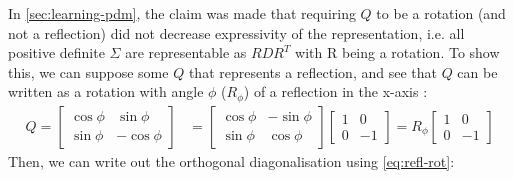 \documentclass[a4paper, 12pt]{report}
\begin{document}
In \ref{sec:learning-pdm}, the claim was made that requiring $Q$ to be a rotation (and not a reflection) did not decrease expressivity of the representation, i.e. all positive definite $\Sigma$ are representable as $RDR^T$ with R being a rotation. To show this, we can suppose some $Q$ that represents a reflection, and see that $Q$ can be written as a rotation with angle $\phi$ ($R_\phi$) of a reflection in the x-axis \cite{poole2015linear}:
\begin{align}
	Q=\begin{bmatrix}
		\cos \phi  &  \sin \phi  \\
		\sin \phi  &  -\cos \phi
	\end{bmatrix} &= \begin{bmatrix}
		\cos \phi  &  -\sin \phi  \\
		\sin \phi  &  \cos \phi
	\end{bmatrix} \begin{bmatrix}
		1  &  0  \\
		0  &  -1
	\end{bmatrix} = R_\phi \begin{bmatrix}
		1  &  0  \\
		0  &  -1
	\end{bmatrix} \label{eq:refl-rot}
\end{align}
Then, we can write out the orthogonal diagonalisation using \ref{eq:refl-rot}:
\end{document}
